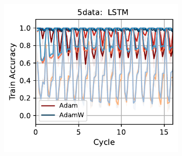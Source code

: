 \begin{figure}[htb!]
{\begin{figure}[t]
{        \includegraphics[width=\textwidth]{figs/Accuracy/5nlp/lstm/5data_50.pdf}
    }\\
\end{figure}}
\end{figure}
